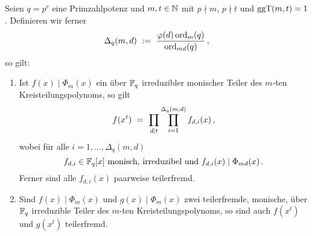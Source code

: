 \begin{satz}
  \label{satz:zerfall_f_x_s}
  Seien $q=p^r$ eine Primzahlpotenz und
  $m,t\in \mathbb{N}$ mit $p\nmid m$, $p\nmid t$ und $\operatorname{ggT}(m,t) = 1$.
  Definieren wir ferner
  \[ \Delta_q(m,d) \ :=\  \frac{\varphi(d) \operatorname{ord}_m(q)}{\operatorname{ord}_{md}(q)}\,,\]
  so gilt:
  \begin{enumerate}
    \item Ist $f(x) \mid \Phi_m(x)$ ein über $\mathbb{F}_q$ irreduzibler monischer Teiler des
      $m$-ten Kreisteilungspolynoms, so gilt
      \[ f(x^t) \ =\  \prod_{d\mid t} 
        \prod_{i=1}^{\Delta_q(m,d)} f_{d,i}(x)\,,\]
      wobei für alle $i=1,\ldots,\Delta_q(m,d)$ 
      \[ f_{d,i}\in \mathbb{F}_q[x] 
        \text{ monisch, irreduzibel und } f_{d,i}(x) \mid \Phi_{md}(x)\,.\]
      Ferner sind alle $f_{d,i}(x)$ paarweise teilerfremd.
    \item Sind $f(x) \mid \Phi_m(x)$ und $g(x) \mid \Phi_m(x)$ zwei
      teilerfremde, monische, über $\mathbb{F}_q$ irreduzible Teiler des $m$-ten
      Kreisteilungspolynoms, so sind auch $f(x^t)$ und $g(x^t)$ teilerfremd.
  \end{enumerate}
\end{satz}
